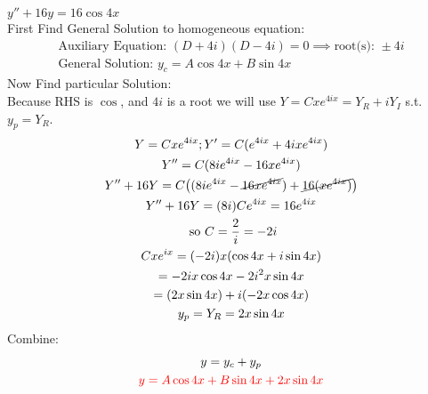 \item [17.] $y''+16y=16\cos{4x}$\\[2mm]
First Find General Solution to homogeneous equation:
\begin{gather*}
    \text{Auxiliary Equation: } (D+4i)(D-4i)=0\implies \text{root(s): } \pm 4i\\
    \text{General Solution: } y_c=A\cos{4x}+B\sin{4x}
\end{gather*}
Now Find particular Solution:\\
Because RHS is $\cos$, and $4i$ is a root we will use $Y=Cxe^{4ix}=Y_R+iY_I$ s.t. $y_p=Y_R$.
\begin{gather*}
    Y=Cxe^{4ix}; Y'=C(e^{4ix}+4ixe^{4ix})\\
    Y''=C(8ie^{4ix}-16xe^{4ix})\\
    Y''+16Y = C
    \big(
    (8ie^{4ix}-\cancel{16xe^{4ix}})
    +\cancel{16(xe^{4ix})}
    \big)\\
    Y''+16Y=(8i)Ce^{4ix}=16e^{4ix}\\
    \text{ so } C=\frac{2}{i}=-2i\\
    Cxe^{ix}=(-2i)x(\cos{4x}+i\sin{4x})\\
    =-2ix\cos{4x}-2i^2x\sin{4x}\\
    = (2x\sin{4x})+i(-2x\cos{4x})\\
    y_p = Y_R = 2x\sin{4x}
\end{gather*}
Combine:
\begin{gather*}
    y=y_c+y_p\\
    \textcolor{red}{y = A\cos{4x}+B\sin{4x}+2x\sin{4x}}
\end{gather*}